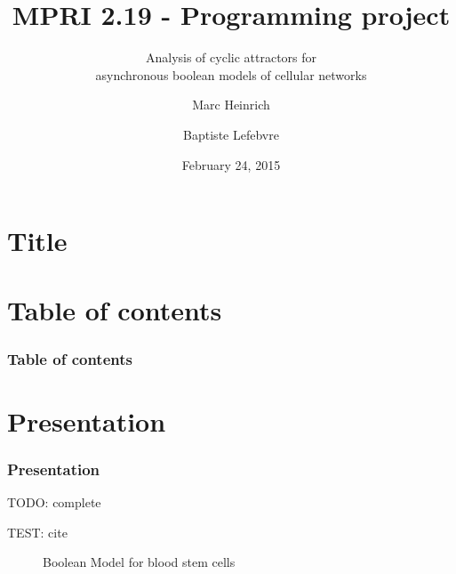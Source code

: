\documentclass{beamer}
\title{MPRI 2.19 - Programming project}
\subtitle{Analysis of cyclic attractors for \\ asynchronous boolean models of cellular networks}
\author{Marc Heinrich \and Baptiste Lefebvre}
\institute{École Normale Supérieure, Computer Science Department}
\date{February 24, 2015}
\begin{document}
\section*{Title}

\begin{frame}
  \titlepage
\end{frame}


\section*{Table of contents}

\begin{frame}
  \frametitle{Table of contents}
  \tableofcontents
\end{frame} 



\section{Presentation}

\begin{frame}
  \frametitle{Presentation}    
  TODO: complete
  
  TEST: cite \cite{Bonzanni}
\end{frame}

\begin{frame}
  \begin{figure}
    \caption{Boolean Model for blood stem cells}
  \end{figure}
\end{frame}
\end{document}
